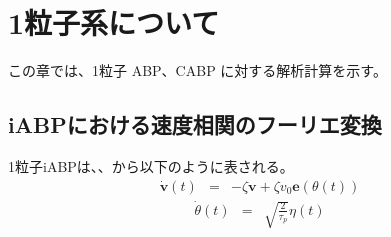 \documentclass[../thesis]{subfiles}
\begin{document}
\renewcommand{\prechaptername}{付録}
\renewcommand{\postchaptername}{}
\renewcommand{\thechapter}{\Alph{chapter}}
\setcounter{chapter}{0}

\chapter{1粒子系について}
この章では、1粒子 ABP、CABP に対する解析計算を示す。
\section{iABPにおける速度相関のフーリエ変換}
1粒子iABPは、、から以下のように表される。
\begin{eqnarray}\label{eq:eom_iabp_1}
    \dot{\bm{v}}(t)&=& - \zeta \bm{v}  +\zeta v_0 \bm{e}(\theta(t))
\end{eqnarray}
\begin{eqnarray}\label{eq:eomabp_2}
    \dot{\theta }(t) &=& \sqrt{\frac{2}{\tau_p}}\eta(t)
\end{eqnarray}
\end{document}
